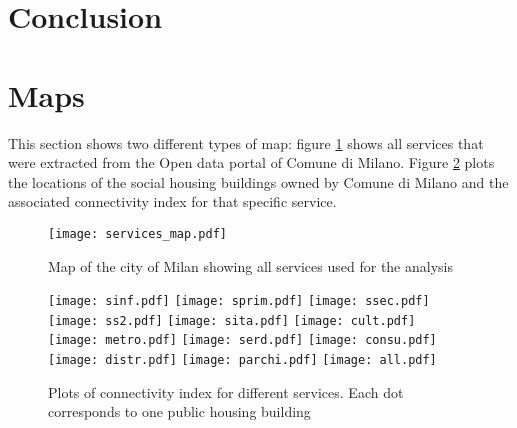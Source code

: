 \documentclass[11pt, titlepage]{article}
\begin{document}
	

\section{Conclusion}
\label{conclusion}


\newpage
\printbibliography

\newpage

\appendix

\section{Maps}
\label{maps}

This section shows two different types of map: figure \ref{servicemap} shows all services that were extracted from the Open data portal of Comune di Milano. Figure \ref{cimap} plots the locations of the social housing buildings owned by Comune di Milano and the associated connectivity index for that specific service.

\begin{figure}[h]
	\texttt{[image: services\_map.pdf]}
	\caption{Map of the city of Milan showing all services used for the analysis}
	\label{servicemap}
\end{figure}

\newpage

\begin{figure}
	\texttt{[image: sinf.pdf]}\hfill
	\texttt{[image: sprim.pdf]}\hfill
	\texttt{[image: ssec.pdf]}
	\\[\smallskipamount]
	\texttt{[image: ss2.pdf]}\hfill
	\texttt{[image: sita.pdf]}\hfill
	\texttt{[image: cult.pdf]}
	\\[\smallskipamount]
	\texttt{[image: metro.pdf]}\hfill
	\texttt{[image: serd.pdf]}\hfill
	\texttt{[image: consu.pdf]}
	\\[\smallskipamount]
	\texttt{[image: distr.pdf]}\hfill
	\texttt{[image: parchi.pdf]}\hfill
	\texttt{[image: all.pdf]}
	\caption{Plots of connectivity index for different services. Each dot corresponds to one  public housing building}
	\label{cimap}
\end{figure}
\end{document}
